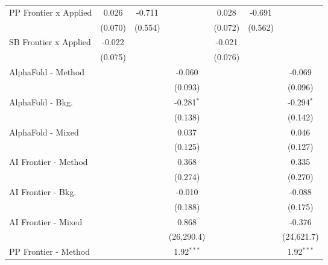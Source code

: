 \begin{tabular}{lcccccc}
   PP Frontier x Applied          & 0.026          & -0.711  &               & 0.028          & -0.691  &   \\   
                                  & (0.070)        & (0.554) &               & (0.072)        & (0.562) &   \\   
   SB Frontier x Applied          & -0.022         &         &               & -0.021         &         &   \\   
                                  & (0.075)        &         &               & (0.076)        &         &   \\   
   AlphaFold - Method             &                &         & -0.060        &                &         & -0.069\\   
                                  &                &         & (0.093)       &                &         & (0.096)\\   
   AlphaFold - Bkg.               &                &         & -0.281$^{*}$  &                &         & -0.294$^{*}$\\   
                                  &                &         & (0.138)       &                &         & (0.142)\\   
   AlphaFold - Mixed              &                &         & 0.037         &                &         & 0.046\\   
                                  &                &         & (0.125)       &                &         & (0.127)\\   
   AI Frontier - Method           &                &         & 0.368         &                &         & 0.335\\   
                                  &                &         & (0.274)       &                &         & (0.270)\\   
   AI Frontier - Bkg.             &                &         & -0.010        &                &         & -0.088\\   
                                  &                &         & (0.188)       &                &         & (0.175)\\   
   AI Frontier - Mixed            &                &         & 0.868         &                &         & -0.376\\   
                                  &                &         & (26,290.4)    &                &         & (24,621.7)\\   
   PP Frontier - Method           &                &         & 1.92$^{***}$  &                &         & 1.92$^{***}$\\   

\end{tabular}
